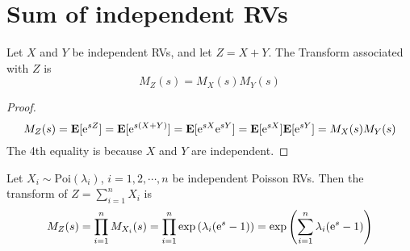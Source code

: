 \section{Sum of independent RVs}
\begin{theorem}
    Let $X$ and $Y$ be independent RVs, and let $Z = X + Y$. The Transform associated with $Z$ is
    \begin{equation}
        M_{Z}(s) = M_{X}(s) M_{Y}(s)
    \end{equation}
\end{theorem}
\begin{proof}
    \begin{equation}
        M_{Z}(s) = \mathbf{E}[\mathrm{e}^{sZ}] = \mathbf{E}[\mathrm{e}^{s(X + Y)}] = \mathbf{E}[\mathrm{e}^{sX} \mathrm{e}^{sY}] = \mathbf{E}[\mathrm{e}^{sX}] \mathbf{E}[\mathrm{e}^{sY}] = M_{X}(s) M_{Y}(s)
    \end{equation}
    The 4th equality is because $X$ and $Y$ are independent.
\end{proof}
\begin{example}
    Let $X_i \sim \text{Poi}(\lambda_i)$, $i = 1, 2, \cdots, n$ be independent Poisson RVs. Then the transform of $Z = \sum_{i=1}^{n} X_i$ is
    \begin{equation}
        M_{Z}(s) = \prod_{i=1}^{n} M_{X_i}(s) = \prod_{i=1}^{n} \exp\qty(\lambda_i(\mathrm{e}^{s} - 1)) = \exp\qty(\sum_{i=1}^{n} \lambda_i(\mathrm{e}^{s} - 1))
    \end{equation}
\end{example}
